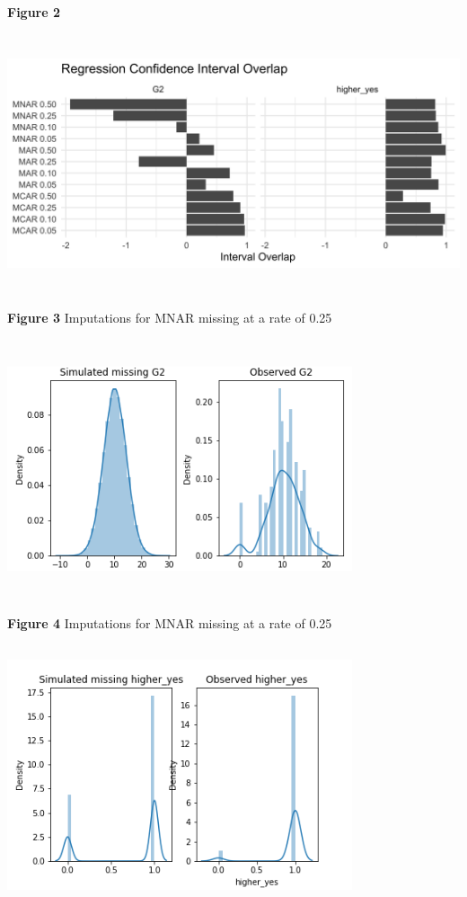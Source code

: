 \documentclass[11pt]{article}
\begin{document}
\textbf{Figure 2}

\includegraphics[width=6.5in, height=3in]{credible-interval-overlap-1}

\textbf{Figure 3} Imputations for MNAR missing at a rate of 0.25

\includegraphics[width=4in, height=3in]{MNAR_025_G2}

\textbf{Figure 4} Imputations for MNAR missing at a rate of 0.25

\includegraphics[width=4in, height=3in]{MNAR_025_higher_yes}
\end{document}
